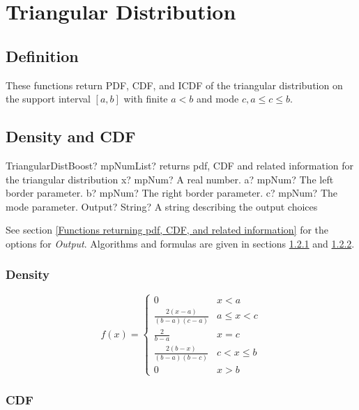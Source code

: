 \section{Triangular Distribution}

\subsection{Definition}
These functions return PDF, CDF, and ICDF of the triangular distribution on the
support interval $[a, b]$ with finite $a < b$ and mode $c, a \leq c \leq b$.

\subsection{Density and CDF}

\begin{mpFunctionsExtract}
	\mpFunctionFive
	{TriangularDistBoost? mpNumList? returns pdf, CDF and related information for the triangular distribution}
	{x? mpNum? A real number.}
	{a? mpNum? The left border parameter.}
	{b? mpNum? The right border parameter.}
	{c? mpNum? The mode parameter.}
	{Output? String? A string describing the output choices}
\end{mpFunctionsExtract}


\vspace{0.3cm}
See section \ref{Functions returning pdf, CDF, and related information} for the options for {\itshape\sffamily Output}. Algorithms and formulas are given in sections \ref{TriangularDistributionDensity} and \ref{TriangularDistributionCDF}.



\subsubsection{Density}
\label{TriangularDistributionDensity}

\begin{equation}
	f(x)=\begin{cases}
		0  & x<a\\
		\frac{2(x-a)}{(b-a)(c-a)} & a \leq x < c\\
		\frac{2}{b-a} & x = c\\
		\frac{2(b-x)}{(b-a)(b-c)} & c < x \leq b\\
		0  & x>b
	\end{cases}
\end{equation}


\subsubsection{CDF}
\label{TriangularDistributionCDF}

